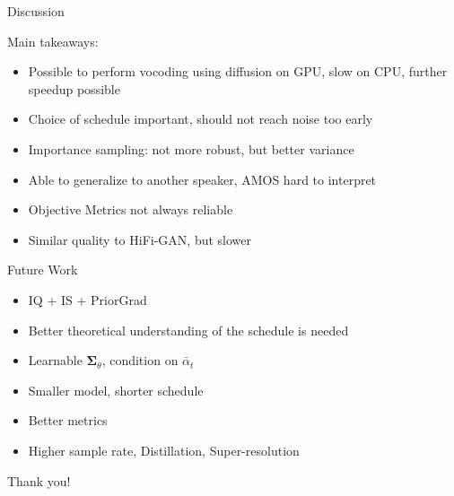 \documentclass{beamer}
\begin{document}

\begin{frame}{Discussion}

    Main takeaways:

    \begin{itemize}
        \setlength\itemsep{1em}
        \item Possible to perform vocoding using diffusion on GPU, slow on CPU, further speedup possible
        \pause 
        \item Choice of schedule important, should not reach noise too early
        \pause
        \item Importance sampling: not more robust, but better variance
        \pause
        \item Able to generalize to another speaker, AMOS hard to interpret
        \pause
        \item Objective Metrics not always reliable
        \pause
        \item Similar quality to HiFi-GAN, but slower

    
    \end{itemize}
    
\end{frame}


\begin{frame}{Future Work}

    \begin{itemize}
        \setlength\itemsep{1em}
        \item IQ + IS + PriorGrad
        \pause
        \item Better theoretical understanding of the schedule is needed
        \pause
        \item Learnable $\bm{\Sigma}_{\theta}$, condition on $\bar{\alpha}_t$
        \pause
        \item Smaller model, shorter schedule
        \pause
        \item Better metrics
        \pause
        \item Higher sample rate, Distillation, Super-resolution 
    \end{itemize}
    
\end{frame}


\begin{frame}

    \Large

    \centering

    \vspace{1.5cm}

    Thank you!
    
\end{frame}
\end{document}
